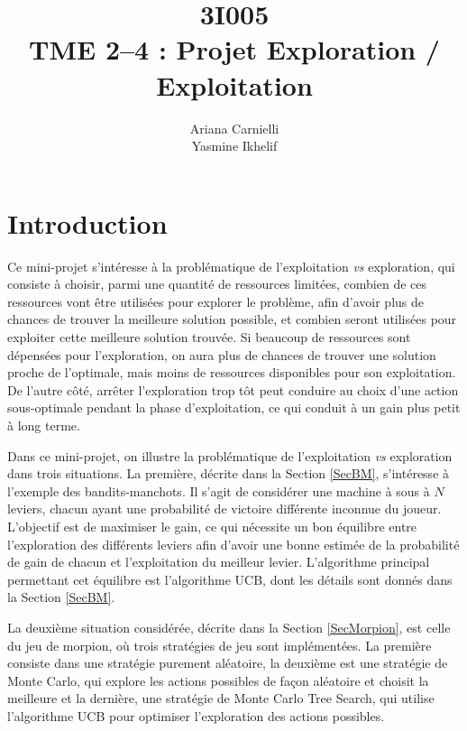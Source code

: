 \documentclass[a4paper,12pt]{article}
\begin{document}
\title{3I005 \\ TME 2--4 : Projet Exploration / Exploitation}
\author{Ariana Carnielli \\ Yasmine Ikhelif}
\date{}

\maketitle

\sloppy

\tableofcontents

\section{Introduction}

Ce mini-projet s'intéresse à la problématique de l'exploitation \emph{vs} exploration, qui consiste à choisir, parmi une quantité de ressources limitées, combien de ces ressources vont être utilisées pour explorer le problème, afin d'avoir plus de chances de trouver la meilleure solution possible, et combien seront utilisées pour exploiter cette meilleure solution trouvée. Si beaucoup de ressources sont dépensées pour l'exploration, on aura plus de chances de trouver une solution proche de l'optimale, mais moins de ressources disponibles pour son exploitation. De l'autre côté, arrêter l'exploration trop tôt peut conduire au choix d'une action sous-optimale pendant la phase d'exploitation, ce qui conduit à un gain plus petit à long terme.

Dans ce mini-projet, on illustre la problématique de l'exploitation \emph{vs} exploration dans trois situations. La première, décrite dans la Section \ref{SecBM}, s'intéresse à l'exemple des bandits-manchots. Il s'agit de considérer une machine à sous à $N$ leviers, chacun ayant une probabilité de victoire différente inconnue du joueur. L'objectif est de maximiser le gain, ce qui nécessite un bon équilibre entre l'exploration des différents leviers afin d'avoir une bonne estimée de la probabilité de gain de chacun et l'exploitation du meilleur levier. L'algorithme principal permettant cet équilibre est l'algorithme UCB, dont les détails sont donnés dans la Section \ref{SecBM}.

La deuxième situation considérée, décrite dans la Section \ref{SecMorpion}, est celle du jeu de morpion, où trois stratégies de jeu sont implémentées. La première consiste dans une stratégie purement aléatoire, la deuxième est une stratégie de Monte Carlo, qui explore les actions possibles de façon aléatoire et choisit la meilleure et la dernière, une stratégie de Monte Carlo Tree Search, qui utilise l'algorithme UCB pour optimiser l'exploration des actions possibles.
\end{document}
